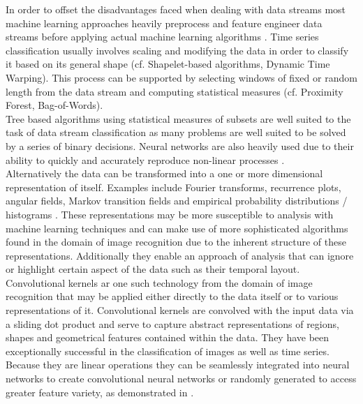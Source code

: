 \documentclass[12pt,a4paper,automark, toc=bib]{scrreprt}
\theoremstyle{definition}
\begin{document}
			In order to offset the disadvantages faced when dealing with data streams most machine learning approaches heavily preprocess and feature engineer data streams before applying actual machine learning algorithms  \cite{Faouzi2022}. Time series classification usually involves scaling and modifying the data in order to classify it based on its general shape (cf. Shapelet-based algorithms, Dynamic Time Warping). This process can be supported by selecting windows of fixed or random length from the data stream and computing statistical measures (cf. Proximity Forest, Bag-of-Words).\\
			Tree based algorithms using statistical measures of subsets are well suited to the task of data stream classification as many problems are well suited to be solved by a series of binary decisions. Neural networks are also heavily used due to their ability to quickly and accurately reproduce non-linear processes  \cite{Faouzi2022, Zhao2021}.\\
			Alternatively the data can be transformed into a one or more dimensional representation of itself. Examples include Fourier transforms, recurrence plots, angular fields, Markov transition fields  \cite{Faouzi2022} and empirical probability distributions / histograms  \cite{Zdravevski2015, Plaud2019}. These representations may be more susceptible to analysis with machine learning techniques and can make use of more sophisticated algorithms found in the domain of image recognition due to the inherent structure of these representations. Additionally they enable an approach of analysis that can ignore or highlight certain aspect of the data such as their temporal layout. \\
			Convolutional kernels ar one such technology from the domain of image recognition that may be applied either directly to the data itself or to various representations of it. Convolutional kernels are convolved with the input data via a sliding dot product and serve to capture abstract representations of regions, shapes and geometrical features contained within the data. They have been exceptionally successful in the classification of images as well as time series. Because they are linear operations they can be seamlessly integrated into neural networks to create convolutional neural networks or randomly generated to access greater feature variety, as demonstrated in  \cite{Dempster2020}.\\
		
\end{document}
